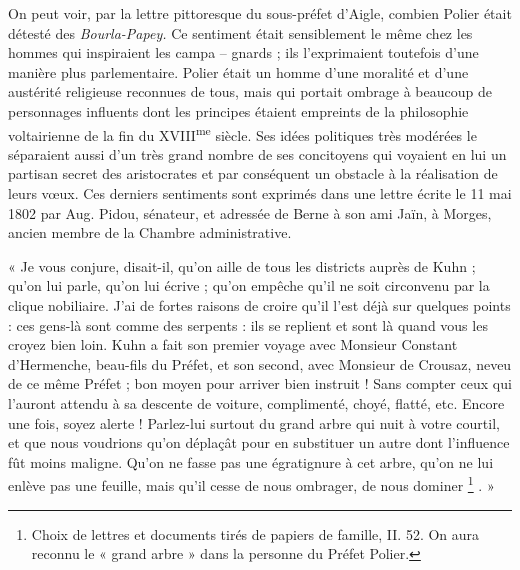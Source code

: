\documentclass[french,twoside]{book} %
\newenvironment{quoteblock}%
  {\begin{quoting}}
  {\end{quoting}}
\newenvironment{quotebar}{%
    \def\FrameCommand{{\color{rubric!10!}\vrule width 0.5em} \hspace{0.9em}}%
    \def\OuterFrameSep{\itemsep} %
    \MakeFramed {\advance\hsize-\width \FrameRestore}
  }%
  {%
    \endMakeFramed
  }
\renewenvironment{quoteblock}%
  {%
    \savenotes
    \setstretch{0.9}
    \begin{quotebar}
  }
  {%
    \end{quotebar}
    \spewnotes
  }
\begin{document}
\noindent On peut voir, par la lettre pittoresque du sous-préfet d’Aigle, combien Polier était détesté des \emph{Bourla-Papey.} Ce sentiment était sensiblement le même chez les hommes qui inspiraient les campa – gnards ; ils l’exprimaient toutefois d’une manière plus parlementaire. Polier était un homme d’une moralité et d’une austérité religieuse reconnues de tous, mais qui portait ombrage à beaucoup de personnages influents dont les principes étaient empreints de la philosophie voltairienne de la fin du XVIII\textsuperscript{me} siècle. Ses idées politiques très modérées le séparaient aussi d’un très grand nombre de ses concitoyens qui voyaient en lui un partisan secret des aristocrates et par conséquent un obstacle à la réalisation de leurs vœux. Ces derniers sentiments sont exprimés dans une lettre écrite le 11 mai 1802 par Aug. Pidou, sénateur, et adressée de Berne à son ami Jaïn, à Morges, ancien membre de la Chambre administrative.\par

\begin{quoteblock}
 \noindent « Je vous conjure, disait-il, qu’on aille de tous les districts auprès de Kuhn ; qu’on lui parle, qu’on lui écrive ; qu’on empêche qu’il ne soit circonvenu par la clique nobiliaire. J’ai de fortes raisons de croire qu’il l’est déjà sur quelques points : ces gens-là sont comme des serpents : ils se replient et sont là quand vous les croyez bien loin. Kuhn a fait son premier voyage avec Monsieur Constant d’Hermenche, beau-fils du Préfet, et son second, avec Monsieur de Crousaz, neveu de ce même Préfet ; bon moyen pour arriver bien instruit ! Sans compter ceux qui l’auront attendu à sa descente de voiture, complimenté, choyé, flatté, etc. Encore une fois, soyez alerte ! Parlez-lui surtout du grand arbre qui nuit à votre courtil, et que nous voudrions qu’on déplaçât pour en substituer un autre dont l’influence fût moins maligne. Qu’on ne fasse pas une égratignure à cet arbre, qu’on ne lui enlève pas une feuille, mais qu’il cesse de nous ombrager, de nous dominer \footnote{Choix de lettres et documents tirés de papiers de famille, II. 52. On aura reconnu le « grand arbre » dans la personne du Préfet Polier.} . »
 \end{quoteblock}
\end{document}
